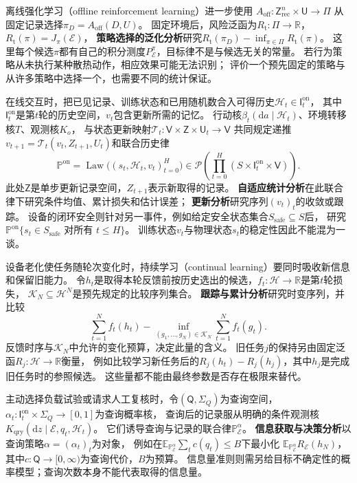 离线强化学习（offline reinforcement learning）进一步使用
$A_{\mathrm{off}}:\mathsf Z_{\mathrm{rec}}^n\times\mathsf U\to\Pi$
从固定记录选择$\pi_D=A_{\mathrm{off}}(D,U)$。
固定环境后，风险泛函为$R_{\mathrm t}:\Pi\to\mathbb R$，$R_{\mathrm t}(\pi)=J_\pi(\mathcal E)$，
\textbf{策略选择的泛化分析}研究$R_{\mathrm t}(\pi_D)-\inf_{\pi\in\Pi}R_{\mathrm t}(\pi)$。
这里每个候选$\pi$都有自己的积分测度$P_{\mathcal E}^{\pi}$，目标律不是与候选无关的常量。
若行为策略从未执行某种散热动作，相应效果可能无法识别；
评价一个预先固定的策略与从许多策略中选择一个，也需要不同的统计保证。

在线交互时，把已见记录、训练状态和已用随机数合入可得历史$\mathscr H_t\in\mathsf I_t^{\mathrm{on}}$，
其中$\mathsf I_t^{\mathrm{on}}$是第$t$轮的历史空间，$v_t$包含更新所需的记忆。
行动核$\beta_t(\mathrm da\mid\mathscr H_t)$、环境转移核$T$、观测核$K_o$，
与状态更新映射$\mathcal T_t:\mathsf V\times\mathsf Z\times\mathsf U_t\to\mathsf V$
共同规定递推$v_{t+1}=\mathcal T_t(v_t,Z_{t+1},U_t)$和联合历史律
\[
  \mathbb P^{\mathrm{on}}
  =\operatorname{Law}\bigl((s_t,\mathscr H_t,v_t)_{t=0}^H\bigr)
  \in\mathcal P\!\left(\prod_{t=0}^H(S\times\mathsf I_t^{\mathrm{on}}\times\mathsf V)\right).
\]
此处$\mathsf Z$是单步更新记录空间，$Z_{t+1}$表示新取得的记录。
\textbf{自适应统计分析}在此联合律下研究条件均值、累计损失和估计误差；
\textbf{更新分析}研究序列$(v_t)_t$的收敛或跟踪。
设备的闭环安全则针对另一事件，例如给定安全状态集合$S_{\mathrm{safe}}\subseteq S$后，
研究$\mathbb P^{\mathrm{on}}\{s_t\in S_{\mathrm{safe}}\text{ 对所有 }t\leq H\}$。
训练状态$v_t$与物理状态$s_t$的稳定性因此不能混为一谈。

设备老化使任务随轮次变化时，持续学习（continual learning）要同时吸收新信息和保留旧能力。
令$h_t$是取得本轮反馈前按历史选出的候选，$f_t:\mathcal H\to\mathbb R$是第$t$轮损失，
$\mathcal K_N\subseteq\mathcal H^N$是预先规定的比较序列集合。
\textbf{跟踪与累计分析}研究时变序列，并比较
\[
  \sum_{t=1}^N f_t(h_t)
  -\inf_{(g_1,\ldots,g_N)\in\mathcal K_N}
       \sum_{t=1}^N f_t(g_t).
\]
反馈时序与$\mathcal K_N$中允许的变化预算，决定此量的含义。
旧任务$j$的保持另由固定泛函$R_j:\mathcal H\to\mathbb R$衡量，
例如比较学习新任务后的$R_j(h_t)-R_j(h_j)$，其中$h_j$是完成旧任务时的参照候选。
这些量都不能由最终参数是否存在极限来替代。

主动选择负载试验或请求人工复核时，令$(\mathsf Q,\Sigma_Q)$为查询空间，
$\alpha_t:\mathsf I_t^{\mathrm{on}}\times\Sigma_Q\to[0,1]$为查询概率核，
查询后的记录服从明确的条件观测核
$K_{\mathrm{qry}}(\mathrm dz\mid\mathcal E,q_t,\mathscr H_t)$。
它们诱导查询与记录的联合律$\mathbb P_{\mathcal E}^{\alpha}$。
\textbf{信息获取与决策分析}以查询策略$\alpha=(\alpha_t)_t$为对象，
例如在$\mathbb E_{\mathbb P_{\mathcal E}^{\alpha}}\sum_t c(q_t)\leq B$下最小化
$\mathbb E_{\mathbb P_{\mathcal E}^{\alpha}}R_{\mathcal E}(h_N)$，
其中$c:\mathsf Q\to[0,\infty)$为查询代价，$B$为预算。
信息量准则则需另给目标不确定性的概率模型；查询次数本身不能代表取得的信息量。

